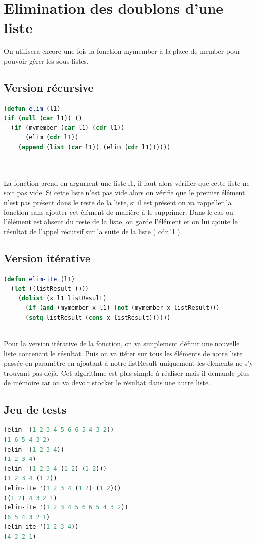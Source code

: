\documentclass[a4paper,10pt]{report}
\begin{document}
      \section{Elimination des doublons d'une liste}
      On utilisera encore une fois la fonction mymember à la place de member pour pouvoir gérer les sous-listes.
      \subsection{Version récursive}
	\begin{lstlisting}[language=Lisp]
(defun elim (l1)
(if (null (car l1)) ()
  (if (mymember (car l1) (cdr l1))
      (elim (cdr l1))
    (append (list (car l1)) (elim (cdr l1))))))
	
	
	\end{lstlisting}
      
      La fonction prend en argument une liste l1, il faut alors vérifier que cette liste ne soit pas vide. Si cette liste n'est pas vide alors on vérifie que le premier élément
      n'est pas présent dans le reste de la liste, si il est présent on va rappeller la fonction sans ajouter cet élément de manière à le supprimer. Dans le cas ou l'élément
      est absent du reste de la liste, on garde l'élément et on lui ajoute le résultat de l'appel récursif sur la suite de la liste ( cdr l1 ).
      

      \subsection{Version itérative}
	\begin{lstlisting}[language=Lisp]
(defun elim-ite (l1)
  (let ((listResult ()))
    (dolist (x l1 listResult)
      (if (and (mymember x l1) (not (mymember x listResult)))
	  (setq listResult (cons x listResult))))))
	
	\end{lstlisting}

	Pour la version itérative de la fonction, on va simplement définir une nouvelle liste contenant le résultat. Puis on va itérer sur tous les éléments de notre liste passée en 
	paramètre en ajoutant à notre listResult uniquement les éléments ne s'y trouvant pas déjà.\newline
	Cet algorithme est plus simple à réaliser mais il demande plus de mémoire car on va devoir stocker le résultat dans une autre liste.
	   \subsection{Jeu de tests}
	  \begin{lstlisting}[language=Lisp]
(elim '(1 2 3 4 5 6 6 5 4 3 2))
(1 6 5 4 3 2)
(elim '(1 2 3 4))
(1 2 3 4)
(elim '(1 2 3 4 (1 2) (1 2)))
(1 2 3 4 (1 2))
(elim-ite '(1 2 3 4 (1 2) (1 2)))
((1 2) 4 3 2 1)
(elim-ite '(1 2 3 4 5 6 6 5 4 3 2))
(6 5 4 3 2 1)
(elim-ite '(1 2 3 4))
(4 3 2 1)

		 \end{lstlisting}
		 \newpage
\end{document}
